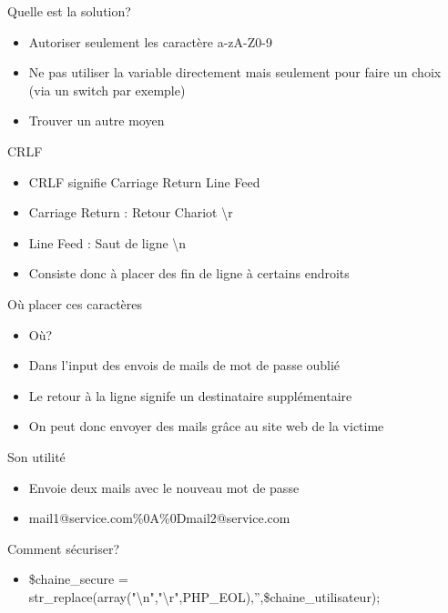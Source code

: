 \documentclass{beamer}
\begin{document}
\begin{frame}{Quelle est la solution?}
	\begin{itemize}
		\item Autoriser seulement les caractère a-zA-Z0-9
		\item Ne pas utiliser la variable directement mais seulement pour faire un choix (via un switch par exemple)
		\item Trouver un autre moyen
	\end{itemize}
\end{frame}

\begin{frame}{CRLF}
	\begin{itemize}
		\item CRLF signifie Carriage Return Line Feed
		\item Carriage Return : Retour Chariot \textbackslash r
		\item Line Feed : Saut de ligne \textbackslash n
		\item Consiste donc à placer des fin de ligne à certains endroits
	\end{itemize}
\end{frame}

\begin{frame}{Où placer ces caractères}
	\begin{itemize}
		\item Où?
		\item Dans l'input des envois de mails de mot de passe oublié
		\item Le retour à la ligne signife un destinataire supplémentaire
		\item On peut donc envoyer des mails grâce au site web de la victime
	\end{itemize}
\end{frame}

\begin{frame}{Son utilité}
	\begin{itemize}
		\item Envoie deux mails avec le nouveau mot de passe
		\item mail1@service.com\%0A\%0Dmail2@service.com
	\end{itemize}
\end{frame}

\begin{frame}{Comment sécuriser?}
	\begin{itemize}
		\item \$chaine\_secure = str\_replace(array("\textbackslash n","\textbackslash r",PHP\_EOL),'',\$chaine\_utilisateur);	
	\end{itemize}
\end{frame}
\end{document}
